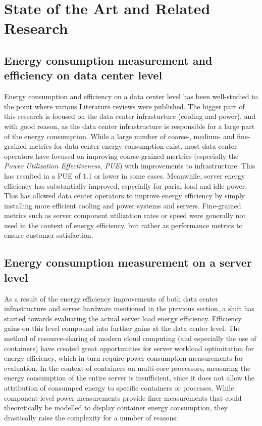 \chapter{State of the Art and Related Research} %
\label{Chapter2}

\section{Energy consumption measurement and efficiency on data center level}

Energy consumption and efficiency on a data center level has been well-studied to the point where various Literature reviews were published\parencite{long2022review}\parencite{jin2020review}. The bigger part of this research is focused on the data center infrasturture (cooling and power), and with good reason, as the data center infrastructure is responsible for a large part of the energy consumption. While a large number of coarse-, medium- and fine-grained metrics for data center energy consumption exist, most data center operators have focused on improving coarse-grained mertrics (especially the \textit{Power Utilization Effectiveness, PUE}) with improvements to infrastructure. This has resulted in a PUE of 1.1 or lower in some cases\parencite{uptime2023pue}. Meanwhile, server energy efficiency has substantially improved, especially for parial load and idle power\parencite{tropgen202416}. This has allowed data center operators to improve energy efficiency by simply installing more efficient cooling and power systems and servers. Fine-grained metrics such as server component utilization rates or speed were generally not used in the context of energy efficiency, but rather as performance metrics to ensure customer satisfaction.

\section{Energy consumption measurement on a server level}

As a result of the energy efficiency improvements of both data center infrastructure and server hardware mentioned in the previous section, a shift has started towards evaluating the actual server load energy efficiency. Efficiency gains on this level compound into further gains at the data center level. The method of resource-sharing of modern cloud computing (and especially the use of containers) have created great opportunities for server workload optimitation for energy efficiency, which in turn require power consumption measurements for evaluation. In the context of containers on multi-core processors, measuring the energy consumption of the entire server is insufficient, since it does not allow the attribution of consumped energy to specific containers or processes. While component-level power measurements provide finer measurements that could theoretically be modelled to display container energy consumption, they drastically raise the complexity for a number of reasons:


